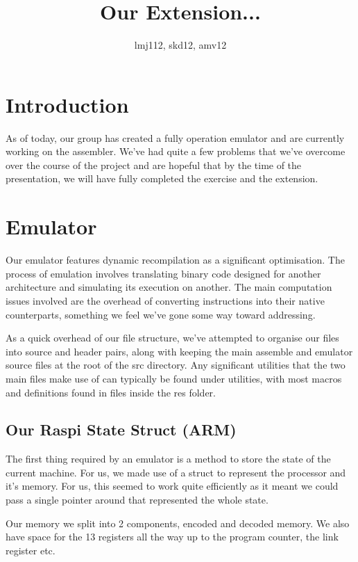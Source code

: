 \documentclass[11pt]{article}
\begin{document}
\title{Our Extension...}
\author{lmj112, skd12, amv12}

\maketitle

\section{Introduction}

As of today, our group has created a fully operation emulator and are currently working on the assembler. We've had quite a few problems that we've overcome over the course of the project and are hopeful that by the time of the presentation, we will have fully completed the exercise and the extension.

\section{Emulator}

Our emulator features dynamic recompilation as a significant optimisation. The process of emulation involves translating binary code designed for another architecture and simulating its execution on another. The main computation issues involved are the overhead of converting instructions into their native counterparts, something we feel we've gone some way toward addressing.

As a quick overhead of our file structure, we've attempted to organise our files into source and header pairs, along with keeping the main assemble and emulator source files at the root of the src directory. Any significant utilities that the two main files make use of can typically be found under utilities, with most macros and definitions found in files inside the res folder.

\subsection{Our Raspi State Struct (ARM)}

The first thing required by an emulator is a method to store the state of the current machine. For us, we made use of a struct to represent the processor and it's memory. For us, this seemed to work quite efficiently as it meant we could pass a single pointer around that represented the whole state.

Our memory we split into 2 components, encoded and decoded memory. We also have space for the 13 registers all the way up to the program counter, the link register etc.
\end{document}

